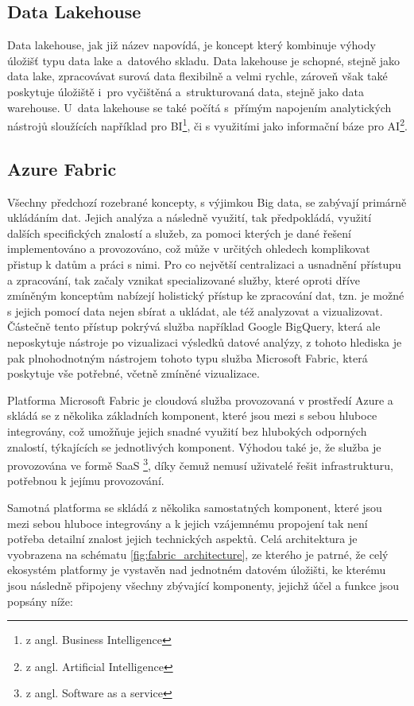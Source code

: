 \documentclass[
  digital,     %
  twoside,     %
  lof,         %
  lot,         %
]{fithesis4}
\begin{document}
\subsection{Data Lakehouse}
Data lakehouse, jak již název napovídá, je koncept který kombinuje výhody úložišť typu data lake a datového skladu. Data lakehouse je schopné, stejně jako data lake, zpracovávat surová data flexibilně a velmi rychle, zároveň však také poskytuje úložiště i pro vyčištěná a strukturovaná data, stejně jako data warehouse. U data lakehouse se také počítá s přímým napojením analytických nástrojů sloužících například pro BI\footnote{z angl. Business Intelligence}, či s využitími jako informační báze pro AI\footnote{z angl. Artificial Intelligence}.

\subsection{Azure Fabric}
Všechny předchozí rozebrané koncepty, s výjimkou Big data, se zabývají primárně ukládáním dat. Jejich analýza a následně využití, tak předpokládá, využití dalších specifických znalostí a služeb, za pomoci kterých je dané řešení implementováno a provozováno, což může v určitých ohledech komplikovat přistup k datům a práci s nimi. Pro co největší centralizaci a usnadnění přístupu a zpracování, tak začaly vznikat specializované služby, které oproti dříve zmíněným konceptům nabízejí holistický přístup ke zpracování dat, tzn. je možné s jejich pomocí data nejen sbírat a ukládat, ale též analyzovat a vizualizovat. Částečně  tento přístup pokrývá služba například  Google BigQuery, která ale neposkytuje nástroje po vizualizaci výsledků datové analýzy,\parencite{googleBigQuery} z tohoto hlediska je pak plnohodnotným nástrojem tohoto typu služba Microsoft Fabric, která poskytuje vše potřebné, včetně zmíněné vizualizace.\parencite{Buck2023}

Platforma Microsoft Fabric je cloudová služba provozovaná v prostředí Azure a skládá se z několika základních komponent, které jsou mezi s sebou hluboce integrovány, což umožňuje jejich snadné využití bez hlubokých odporných znalostí, týkajících se jednotlivých komponent. Výhodou také je, že služba je provozována ve formě SaaS \footnote{z angl. Software as a service}, díky čemuž nemusí uživatelé řešit infrastrukturu, potřebnou k jejímu provozování.\parencite{Buck2023}

Samotná platforma se skládá z několika samostatných komponent, které jsou mezi sebou hluboce integrovány a k jejich vzájemnému propojení tak není potřeba detailní znalost jejich technických aspektů. Celá architektura je vyobrazena na schématu \ref{fig:fabric_architecture}, ze kterého je patrné, že celý ekosystém platformy je vystavěn nad jednotném datovém úložišti, ke kterému jsou následně připojeny všechny zbývající komponenty, jejichž účel a funkce jsou popsány níže:
\end{document}
